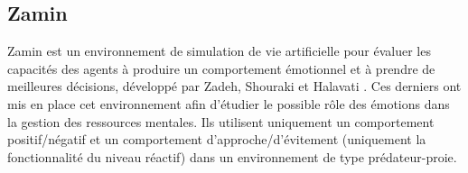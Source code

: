 \subsection{Zamin}

Zamin est un environnement de simulation de vie artificielle pour évaluer les capacités des agents à produire un comportement émotionnel et à prendre de meilleures décisions, développé par Zadeh, Shouraki et Halavati \parencite{zadeh2006emotional}. Ces derniers ont mis en place cet environnement afin d’étudier le possible rôle des émotions dans la gestion des ressources mentales. Ils utilisent uniquement un comportement positif/négatif et un comportement d'approche/d'évitement (uniquement la fonctionnalité du niveau réactif) dans un environnement de type prédateur-proie.

